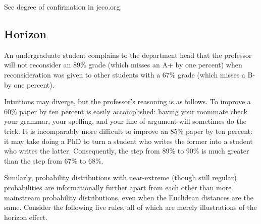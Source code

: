 \documentclass[11pt]{article}
\begin{document}
See degree of confirmation in jeco.org.

\subsection{Horizon}
\label{Horizon}

\begin{quotex}
  \label{ex:complaint} An
  undergraduate student complains to the department head that the
  professor will not reconsider an 89\% grade (which misses an A+ by
  one percent) when reconsideration was given to other students with a
  67\% grade (which misses a B- by one percent).
\end{quotex}

Intuitions may diverge, but the professor's reasoning is as follows.
To improve a 60\% paper by ten percent is easily accomplished: having
your roommate check your grammar, your spelling, and your line of
argument will sometimes do the trick. It is incomparably more
difficult to improve an 85\% paper by ten percent: it may take doing a
PhD to turn a student who writes the former into a student who writes
the latter. Consequently, the step from 89\% to 90\% is much greater
than the step from 67\% to 68\%.

Similarly, probability distributions with near-extreme (though still
regular) probabilities are informationally further apart from each
other than more mainstream probability distributions, even when the
Euclidean distances are the same. Consider the following five rules,
all of which are merely illustrations of the horizon effect.
\end{document}
